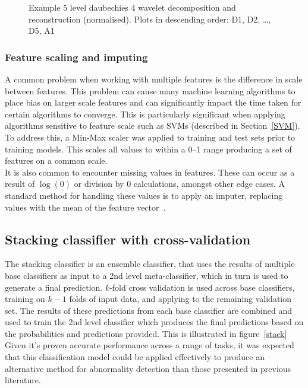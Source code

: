 \documentclass[titlepage, 12pt]{scrartcl} \usepackage{enumitem}
\begin{document}
\begin{figure}[H]
    \caption{Example 5 level daubechies 4 wavelet decomposition and reconstruction (normalised). Plots in descending order: D1, D2, \ldots, D5, A1}
    \label{wave}
\end{figure}

\subsubsection{Feature scaling and imputing}
A common problem when working with multiple features is the difference in scale
between features. This problem can cause many machine learning algorithms to place
bias on larger scale features and can significantly impact the time taken for
certain algorithms to converge. This is particularly significant when applying
algorithms sensitive to feature scale such as SVMs (described in
Section~\ref{SVM}). To address this, a Min-Max scaler was applied
to training and test sets prior to training models. This scales all values to within a
0--1 range producing a set of features on a common scale.\\
It is also common to encounter missing values in features. These can occur as a
result of $\log(0)$ or division by 0 calculations, amongst other edge cases. A
standard method for handling these values is to apply an imputer, replacing
values with the mean of the feature vector~\parencite{VanderPlas2017}.

\subsection{Stacking classifier with cross-validation}\label{class}
The stacking classifier is an ensemble classifier, that uses the results of
multiple base classifiers as input to a 2nd level meta-classifier, which in
turn is used to generate a final prediction. $k$-fold cross validation is used
across base classifiers, training on $k-1$ folds of input data, and applying
to the remaining validation set. The results of these predictions from each
base classifier are combined and used to train the 2nd level classifier which
produces the final predictions based on the probabilities and predictions
provided. This is illustrated in figure~\ref{stack}\\
Given it's proven accurate performance across a range of tasks, it was
expected that this classification model could be applied effectively to produce
an alternative method for abnormality detection than those presented in
previous literature.
\end{document}
